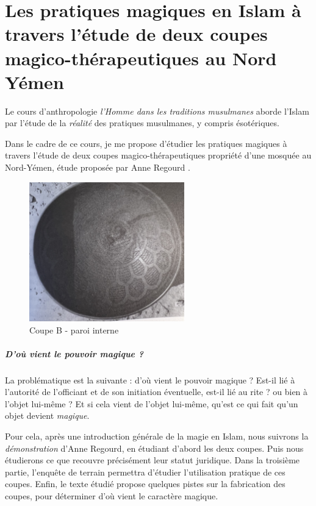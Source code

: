 

\chapter{Les pratiques magiques en Islam à travers l'étude de deux coupes magico-thérapeutiques au Nord Yémen}

Le cours d'anthropologie \textit{l'Homme dans les traditions musulmanes} aborde l'Islam par l'étude de la \textit{réalité} des pratiques musulmanes, y compris ésotériques. 

Dans le cadre de ce cours, je me propose d'étudier les pratiques magiques à travers l'étude de deux coupes magico-thérapeutiques propriété d'une mosquée au Nord-Yémen, étude proposée par Anne Regourd \citep{Regourd_2007}.
\begin{figure}
    \centering
      
 \includegraphics[width=0.6\textwidth]{HommeetIslam/Images/IMG_2457recadre.png}
 \caption{Coupe B  - paroi interne}
 
    \label{fig:my_label}
\end{figure}
\paragraph{D'où vient le pouvoir magique ?} La problématique est la suivante : d'où vient le pouvoir magique ? Est-il lié à l'autorité de l'officiant et de son initiation éventuelle, est-il lié au rite ? ou bien à l'objet lui-même ? Et si cela vient de l'objet lui-même, qu'est ce qui fait qu'un objet devient \textit{magique}.

Pour cela, après une introduction générale de la magie en Islam, nous suivrons la \textit{démonstration} d'Anne Regourd, en étudiant d'abord les deux coupes. Puis nous étudierons ce que recouvre précisément leur statut juridique. Dans la troisième partie, l'enquête de terrain permettra d'étudier l'utilisation pratique de ces coupes. Enfin, le texte étudié propose quelques pistes sur la fabrication des coupes, pour déterminer d'où vient le caractère magique. 

